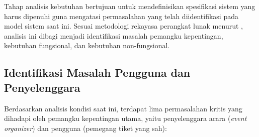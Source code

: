 Tahap analisis kebutuhan bertujuan untuk mendefinisikan spesifikasi sistem yang harus dipenuhi guna mengatasi permasalahan yang telah diidentifikasi pada model sistem saat ini. Sesuai metodologi rekayasa perangkat lunak menurut \textcite{pressman2019}, analisis ini dibagi menjadi identifikasi masalah pemangku kepentingan, kebutuhan fungsional, dan kebutuhan non-fungsional.

\subsection{Identifikasi Masalah Pengguna dan Penyelenggara}
\label{subsec:identifikasi_masalah}
Berdasarkan analisis kondisi saat ini, terdapat lima permasalahan kritis yang dihadapi oleh pemangku kepentingan utama, yaitu penyelenggara acara (\textit{event organizer}) dan pengguna (pemegang tiket yang sah):

